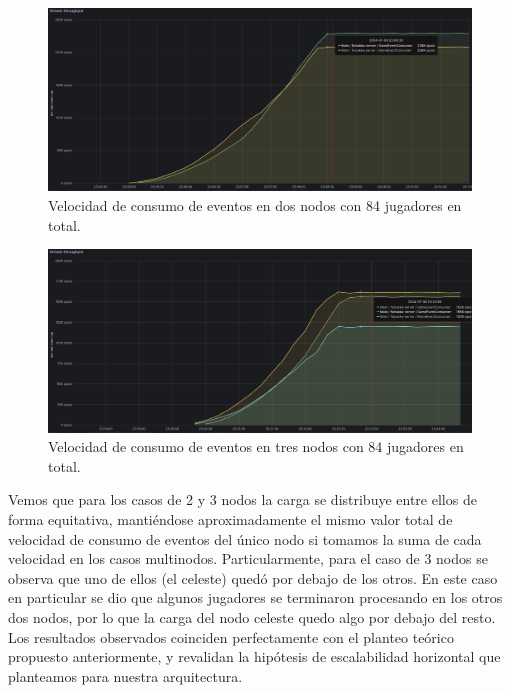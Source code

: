 \begin{figure}[htbp]
    \centering
    \includegraphics[width=1\textwidth]{../assets/fiubakka-consumer-two-node-metrics.png}
    \caption{Velocidad de consumo de eventos en dos nodos con 84 jugadores en total.}
\end{figure}

\newpage

\begin{figure}[htbp]
    \centering
    \includegraphics[width=1\textwidth]{../assets/fiubakka-consumer-three-node-metrics.png}
    \caption{Velocidad de consumo de eventos en tres nodos con 84 jugadores en total.}
\end{figure}

Vemos que para los casos de 2 y 3 nodos la carga se distribuye entre ellos de forma equitativa, mantiéndose aproximadamente el mismo valor total de velocidad de consumo de eventos del único nodo si tomamos la suma
de cada velocidad en los casos multinodos. Particularmente, para el caso de 3 nodos se observa que uno de ellos (el celeste) quedó por debajo de los otros. En este caso en particular se dio que algunos jugadores se terminaron procesando
en los otros dos nodos, por lo que la carga del nodo celeste quedo algo por debajo del resto. Los resultados observados coinciden perfectamente con el planteo teórico propuesto anteriormente, y revalidan la hipótesis de escalabilidad
horizontal que planteamos para nuestra arquitectura.


